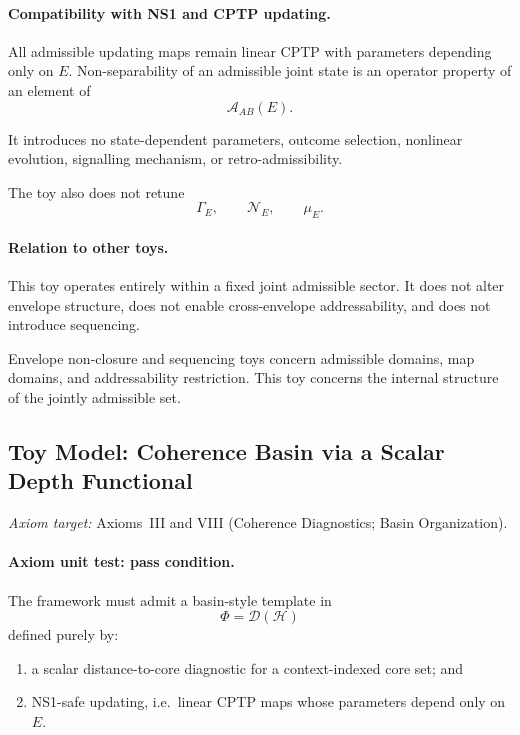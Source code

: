 \documentclass[aps,prx,onecolumn,11pt]{revtex4-2}
\theoremstyle{plain}
\theoremstyle{definition}
\theoremstyle{remark}
\begin{document}
\paragraph{Compatibility with NS1 and CPTP updating.}

All admissible updating maps remain linear CPTP with parameters
depending only on \(E\). Non-separability of an admissible joint state
is an operator property of an element of
\[
\mathcal A_{AB}(E).
\]

It introduces no state-dependent parameters, outcome selection,
nonlinear evolution, signalling mechanism, or retro-admissibility.

The toy also does not retune
\[
\Gamma_E,
\qquad
\mathcal N_E,
\qquad
\mu_E.
\]

\paragraph{Relation to other toys.}

This toy operates entirely within a fixed joint admissible sector. It
does not alter envelope structure, does not enable cross-envelope
addressability, and does not introduce sequencing.

Envelope non-closure and sequencing toys concern admissible domains,
map domains, and addressability restriction. This toy concerns the
internal structure of the jointly admissible set.

\subsection{Toy Model: Coherence Basin via a Scalar Depth Functional}
\label{toy:coherence_basin_depth_functional_contraction}

\noindent\emph{Axiom target:} Axioms~III and VIII (Coherence Diagnostics; Basin Organization).

\paragraph{Axiom unit test: pass condition.}

The framework must admit a basin-style template in
\[
\Phi=\mathcal D(\mathcal H)
\]
defined purely by:

\begin{enumerate}[label=(\roman*), leftmargin=2.2em]
\item a scalar distance-to-core diagnostic for a context-indexed core
set; and
\item NS1-safe updating, i.e.\ linear CPTP maps whose parameters depend
only on \(E\).
\end{enumerate}
\end{document}

